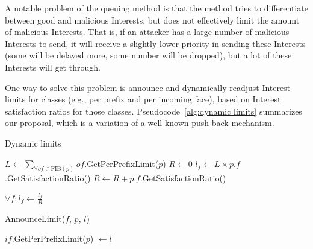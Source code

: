 

A notable problem of the queuing method is that the method tries to differentiate between good and malicious Interests, but does not effectively limit the amount of malicious Interests.
That is, if an attacker has a large number of malicious Interests to send, it will receive a slightly lower priority in sending these Interests (some will be delayed more, some number will be dropped), but a lot of these Interests will get through.

One way to solve this problem is announce and dynamically readjust Interest limits for classes (e.g., per prefix and per incoming face), based on Interest satisfaction ratios for those classes. 
Pseudocode~\ref{alg:dynamic limits} summarizes our proposal, which is a variation of a well-known push-back mechanism.




\begin{algorithm}[h]
\caption{Dynamic limits}
\label{alg:dynamic limits}
\begin{algorithmic}[1]

 
    \State $L \leftarrow \displaystyle\sum\limits_{\mathrm{\forall \mathit{of} \in FIB(\mathit{p})}}{}{}of$.GetPerPrefixLimit($p$)
    \State $R \leftarrow 0$
        \State $l_f \leftarrow L \times p$.$f$.GetSatisfactionRatio()
        \State $R \leftarrow R + p$.$f$.GetSatisfactionRatio()
    \EndFor

     
        \State $\forall f : l_f \leftarrow \displaystyle\frac{l_f}{R}$ 
    \EndIf

        \State AnnounceLimit($f$, $p$, $l$)
\EndFor
\EndFunction

\vspace{0.2cm}

\State{} 
    \State $if$.GetPerPrefixLimit($p$) $\leftarrow l$ 
\EndFunction

\end{algorithmic}
\end{algorithm}

